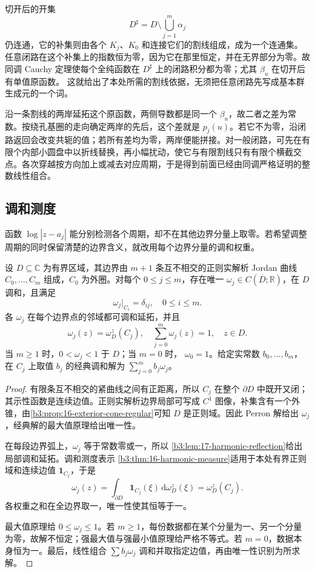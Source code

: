 \ProseParagraphBreak
切开后的开集
\[
 D^\sharp=D\setminus\bigcup_{j=1}^m\alpha_j
\]
仍连通，它的补集则由各个 \(K_j\)、\(K_0\) 和连接它们的割线组成，成为一个连通集。任意闭路在这个补集上的指数恒为零，因为它在那里恒定，并在无界部分为零。故同调 Cauchy 定理使每个全纯函数在
\(D^\sharp\) 上的闭路积分都为零；尤其 \(\beta_u\) 在切开后有单值原函数。
这就给出了本处所需的割线依据，无须把任意闭路先写成基本群生成元的一个词。

\ProseParagraphBreak
沿一条割线的两岸延拓这个原函数，两侧导数都是同一个 \(\beta_u\)，故二者之差为常数。按绕孔基圈的走向确定两岸的先后，这个差就是 \(p_j(u)\)。若它不为零，沿闭路返回会改变共轭的值；若所有差均为零，两岸便能拼接。对一般闭路，可先在有限个内部小圆盘中以折线替换，再小幅扰动，使它与有限割线只有有限个横截交点。各次穿越按方向加上或减去对应周期，于是得到前面已经由同调严格证明的整数线性组合。

\subsection{调和测度}
\label{b3:subsec:170502}

函数 \(\log|z-a_j|\) 能分别检测各个周期，却不在其他边界分量上取零。若希望调整周期的同时保留清楚的边界含义，就改用每个边界分量的调和权重。

\begin{proposition}[边界分量的调和权重]\label{b3:prop:17-component-weights}
设 \(D\subseteq\mathbb C\) 为有界区域，其边界由 \(m+1\) 条互不相交的正则实解析 Jordan 曲线 \(C_0,\ldots,C_m\) 组成，\(C_0\) 为外圈。对每个
\(0\le j\le m\)，存在唯一 \(\omega_j\in C(\overline D;\mathbb R)\)，在
\(D\) 调和，且满足
\[
 \omega_j|_{C_i}=\delta_{ij},\quad 0\le i\le m.
\]
各 \(\omega_j\) 在每个边界点的邻域都可调和延拓，并且
\[
 \omega_j(z)=\omega_D^z(C_j),\quad
 \sum_{j=0}^m\omega_j(z)=1,\quad z\in D.
\]
当 \(m\ge1\) 时，\(0<\omega_j<1\) 于 \(D\)；当 \(m=0\) 时，
\(\omega_0=1\)。给定实常数 \(b_0,\ldots,b_m\)，在 \(C_j\) 上取值
\(b_j\) 的经典调和解为 \(\sum_{j=0}^m b_j\omega_j\)。
\end{proposition}
\begin{proof}
有限条互不相交的紧曲线之间有正距离，所以 \(C_j\) 在整个
\(\partial D\) 中既开又闭；其示性函数是连续边值。正则实解析边界局部可写成
\(C^1\) 图像，补集含有一个外锥，由\cref{b3:prop:16-exterior-cone-regular}可知
\(D\) 是正则域。因此 Perron 解给出 \(\omega_j\)，经典解的最大值原理给出唯一性。

在每段边界弧上，\(\omega_j\) 等于常数零或一，所以
\cref{b3:lem:17-harmonic-reflection}给出局部调和延拓。调和测度表示
\cref{b3:thm:16-harmonic-measure}适用于本处有界正则域和连续边值
\(\mathbf1_{C_j}\)，于是
\[
 \omega_j(z)=\int_{\partial D}\mathbf1_{C_j}(\xi)\,\mathrm d\omega_D^z(\xi)
 =\omega_D^z(C_j).
\]
各权重之和在全边界取一，唯一性使其恒等于一。

最大值原理给 \(0\le\omega_j\le1\)。若 \(m\ge1\)，每份数据都在某个分量为一、另一个分量为零，故解不恒定；强最大值与强最小值原理给严格不等式。若 \(m=0\)，数据本身恒为一。最后，线性组合
\(\sum b_j\omega_j\) 调和并取指定边值，再由唯一性识别为所求解。
\end{proof}

